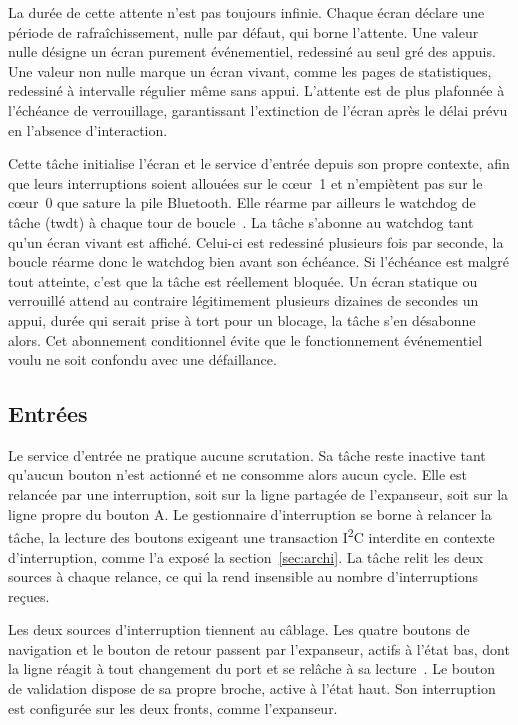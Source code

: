 La durée de cette attente n'est pas toujours infinie. Chaque écran déclare une période de rafraîchissement, nulle par défaut, qui borne l'attente. Une valeur nulle désigne un écran purement événementiel, redessiné au seul gré des appuis. Une valeur non nulle marque un écran vivant, comme les pages de statistiques, redessiné à intervalle régulier même sans appui. L'attente est de plus plafonnée à l'échéance de verrouillage, garantissant l'extinction de l'écran après le délai prévu en l'absence d'interaction.

Cette tâche initialise l'écran et le service d'entrée depuis son propre contexte, afin que leurs interruptions soient allouées sur le cœur~1 et n'empiètent pas sur le cœur~0 que sature la pile Bluetooth. Elle réarme par ailleurs le watchdog de tâche (\gls{twdt}) à chaque tour de boucle~\cite{ESP32_IDF_guide}. La tâche s'abonne au watchdog tant qu'un écran vivant est affiché. Celui-ci est redessiné plusieurs fois par seconde, la boucle réarme donc le watchdog bien avant son échéance. Si l'échéance est malgré tout atteinte, c'est que la tâche est réellement bloquée. Un écran statique ou verrouillé attend au contraire légitimement plusieurs dizaines de secondes un appui, durée qui serait prise à tort pour un blocage, la tâche s'en désabonne alors. Cet abonnement conditionnel évite que le fonctionnement événementiel voulu ne soit confondu avec une défaillance.

\subsection{Entrées}

Le service d'entrée ne pratique aucune scrutation. Sa tâche reste inactive tant qu'aucun bouton n'est actionné et ne consomme alors aucun cycle. Elle est relancée par une interruption, soit sur la ligne partagée de l'expanseur, soit sur la ligne propre du bouton A. Le gestionnaire d'interruption se borne à relancer la tâche, la lecture des boutons exigeant une transaction I\textsuperscript{2}C interdite en contexte d'interruption, comme l'a exposé la section~\ref{sec:archi}. La tâche relit les deux sources à chaque relance, ce qui la rend insensible au nombre d'interruptions reçues.

Les deux sources d'interruption tiennent au câblage. Les quatre boutons de navigation et le bouton de retour passent par l'expanseur, actifs à l'état bas, dont la ligne réagit à tout changement du port et se relâche à sa lecture~\cite{diodes_inc_PI4IOE5V9554}. Le bouton de validation dispose de sa propre broche, active à l'état haut. Son interruption est configurée sur les deux fronts, comme l'expanseur.

